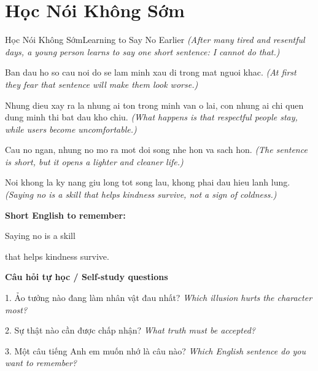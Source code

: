 \section{Học Nói Không Sớm}
\begin{truyen}{Học Nói Không Sớm}{Learning to Say No Earlier}
\textit{(After many tired and resentful days, a young person learns to say one short sentence: I cannot do that.)}

Ban dau ho so cau noi do se lam minh xau di trong mat nguoi khac.
\textit{(At first they fear that sentence will make them look worse.)}

Nhung dieu xay ra la nhung ai ton trong minh van o lai, con nhung ai chi quen dung minh thi bat dau kho chiu.
\textit{(What happens is that respectful people stay, while users become uncomfortable.)}

Cau no ngan, nhung no mo ra mot doi song nhe hon va sach hon.
\textit{(The sentence is short, but it opens a lighter and cleaner life.)}

\end{truyen}

\begin{baihoc}
Noi khong la ky nang giu long tot song lau, khong phai dau hieu lanh lung.
\textit{(Saying no is a skill that helps kindness survive, not a sign of coldness.)}
\end{baihoc}

\begin{ghinhoanh}
\textbf{Short English to remember:}

Saying no is a skill

that helps kindness survive.

\end{ghinhoanh}

\begin{tuhocnhanh}
\textbf{Câu hỏi tự học / Self-study questions}

1. Ảo tưởng nào đang làm nhân vật đau nhất? \textit{Which illusion hurts the character most?}

2. Sự thật nào cần được chấp nhận? \textit{What truth must be accepted?}

3. Một câu tiếng Anh em muốn nhớ là câu nào? \textit{Which English sentence do you want to remember?}
\end{tuhocnhanh}
